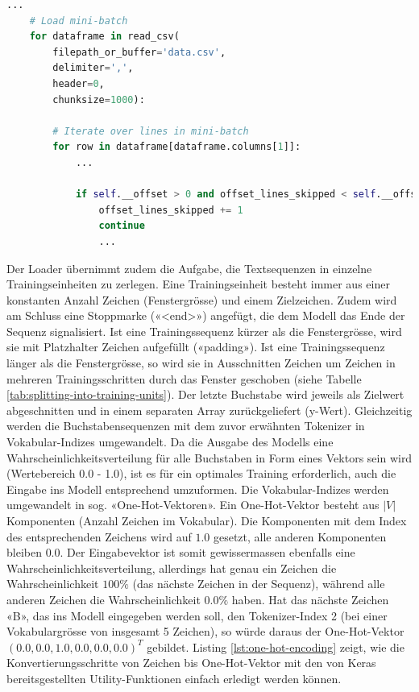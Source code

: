 \begin{lstlisting}[language=Python, caption=Mini-Batch Loader, label=lst:mini-batch-loader]
    ...
    # Load mini-batch
    for dataframe in read_csv(
        filepath_or_buffer='data.csv',
        delimiter=',',
        header=0,
        chunksize=1000):

        # Iterate over lines in mini-batch
        for row in dataframe[dataframe.columns[1]]:
            ...

            if self.__offset > 0 and offset_lines_skipped < self.__offset:
                offset_lines_skipped += 1
                continue
                ...
\end{lstlisting}

Der Loader übernimmt zudem die Aufgabe, die Textsequenzen in einzelne Trainingseinheiten zu zerlegen.
Eine Trainingseinheit besteht immer aus einer konstanten Anzahl Zeichen (Fenstergrösse) und einem Zielzeichen.
Zudem wird am Schluss eine Stoppmarke («<end>») angefügt, die dem Modell das Ende der Sequenz signalisiert.
Ist eine Trainingssequenz kürzer als die Fenstergrösse, wird sie mit Platzhalter Zeichen aufgefüllt («padding»).
Ist eine Trainingssequenz länger als die Fenstergrösse, so wird sie in Ausschnitten Zeichen um Zeichen in mehreren Trainingsschritten durch das Fenster geschoben (siehe Tabelle \ref{tab:splitting-into-training-units}).
Der letzte Buchstabe wird jeweils als Zielwert abgeschnitten und in einem separaten Array zurückgeliefert (y-Wert).
Gleichzeitig werden die Buchstabensequenzen mit dem zuvor erwähnten Tokenizer in Vokabular-Indizes umgewandelt.
Da die Ausgabe des Modells eine Wahrscheinlichkeitsverteilung für alle Buchstaben in Form eines Vektors sein wird (Wertebereich 0.0 - 1.0), ist es
für ein optimales Training erforderlich, auch die Eingabe ins Modell entsprechend umzuformen.
Die Vokabular-Indizes werden umgewandelt in sog. «One-Hot-Vektoren».
Ein One-Hot-Vektor besteht aus $ |V| $ Komponenten (Anzahl Zeichen im Vokabular).
Die Komponenten mit dem Index des entsprechenden Zeichens wird auf $ 1.0 $ gesetzt, alle anderen Komponenten bleiben $ 0.0 $.
Der Eingabevektor ist somit gewissermassen ebenfalls eine Wahrscheinlichkeitsverteilung, allerdings hat genau ein Zeichen die Wahrscheinlichkeit $ 100\% $ (das nächste Zeichen in der Sequenz), während
alle anderen Zeichen die Wahrscheinlichkeit $0.0\%$ haben.
Hat das nächste Zeichen «B», das ins Modell eingegeben werden soll, den Tokenizer-Index 2 (bei einer Vokabulargrösse von insgesamt 5 Zeichen), so würde daraus der One-Hot-Vektor $ (0.0, 0.0, 1.0, 0.0, 0.0, 0.0)^{T} $ gebildet.
Listing \ref{lst:one-hot-encoding} zeigt, wie die Konvertierungsschritte von Zeichen bis One-Hot-Vektor mit den von Keras bereitsgestellten Utility-Funktionen einfach erledigt werden können.

